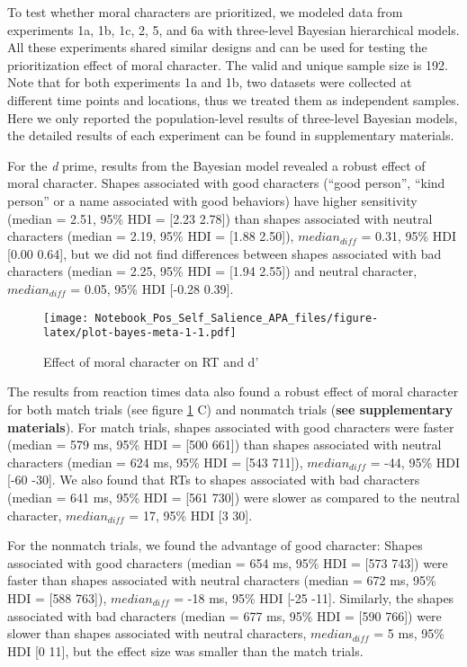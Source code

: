 \documentclass[
  man]{apa6}
\begin{document}
To test whether moral characters are prioritized, we modeled data from experiments 1a, 1b, 1c, 2, 5, and 6a with three-level Bayesian hierarchical models. All these experiments shared similar designs and can be used for testing the prioritization effect of moral character. The valid and unique sample size is 192. Note that for both experiments 1a and 1b, two datasets were collected at different time points and locations, thus we treated them as independent samples. Here we only reported the population-level results of three-level Bayesian models, the detailed results of each experiment can be found in supplementary materials.

For the \emph{d} prime, results from the Bayesian model revealed a robust effect of moral character. Shapes associated with good characters (``good person'', ``kind person'' or a name associated with good behaviors) have higher sensitivity (median = 2.51, 95\% HDI = {[}2.23 2.78{]}) than shapes associated with neutral characters (median = 2.19, 95\% HDI = {[}1.88 2.50{]}), \(median_{diff}\) = 0.31, 95\% HDI {[}0.00 0.64{]}, but we did not find differences between shapes associated with bad characters (median = 2.25, 95\% HDI = {[}1.94 2.55{]}) and neutral character, \(median_{diff}\) = 0.05, 95\% HDI {[}-0.28 0.39{]}.

\begin{figure}
\centering
\texttt{[image: Notebook\_Pos\_Self\_Salience\_APA\_files/figure-latex/plot-bayes-meta-1-1.pdf]}
\caption{\label{fig:plot-bayes-meta-1}Effect of moral character on RT and d'}
\end{figure}

The results from reaction times data also found a robust effect of moral character for both match trials (see figure \ref{fig:plot-bayes-meta-1} C) and nonmatch trials (\textbf{see supplementary materials}). For match trials, shapes associated with good characters were faster (median = 579 ms, 95\% HDI = {[}500 661{]}) than shapes associated with neutral characters (median = 624 ms, 95\% HDI = {[}543 711{]}), \(median_{diff}\) = -44, 95\% HDI {[}-60 -30{]}. We also found that RTs to shapes associated with bad characters (median = 641 ms, 95\% HDI = {[}561 730{]}) were slower as compared to the neutral character, \(median_{diff}\) = 17, 95\% HDI {[}3 30{]}.

For the nonmatch trials, we found the advantage of good character: Shapes associated with good characters (median = 654 ms, 95\% HDI = {[}573 743{]}) were faster than shapes associated with neutral characters (median = 672 ms, 95\% HDI = {[}588 763{]}), \(median_{diff}\) = -18 ms, 95\% HDI {[}-25 -11{]}. Similarly, the shapes associated with bad characters (median = 677 ms, 95\% HDI = {[}590 766{]}) were slower than shapes associated with neutral characters, \(median_{diff}\) = 5 ms, 95\% HDI {[}0 11{]}, but the effect size was smaller than the match trials.
\end{document}
